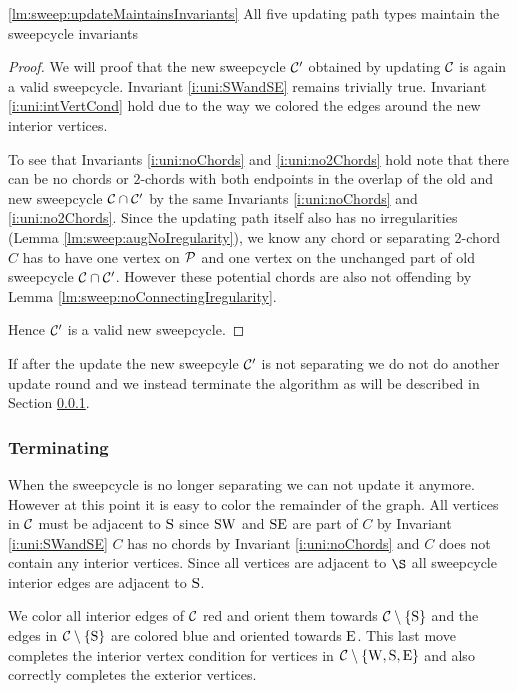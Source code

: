     \begin{lemma}
      \ref{lm:sweep:updateMaintainsInvariants}
      All five updating path types maintain the sweepcycle invariants
    \end{lemma}
    \begin{proof}
      We will proof that the new sweepcycle $\C'$ obtained by updating $\C$ is again a valid sweepcycle. Invariant \ref{i:uni:SWandSE} remains trivially true. Invariant \ref{i:uni:intVertCond} hold due to the way we colored the edges around the new interior vertices.

      To see that Invariants \ref{i:uni:noChords} and \ref{i:uni:no2Chords} hold note that there can be no chords or $2$-chords with both endpoints in the overlap of the old and new sweepcycle $\C \cap \C'$ by the same Invariants \ref{i:uni:noChords} and \ref{i:uni:no2Chords}. Since the updating path itself also has no irregularities (Lemma \ref{lm:sweep:augNoIregularity}),
      we know any chord or separating $2$-chord $C$ has to have one vertex on $\P$ and one vertex on the unchanged part of old sweepcycle $\C \cap \C'$. However these potential chords are also not offending by Lemma \ref{lm:sweep:noConnectingIregularity}.

      Hence $\C'$ is a valid new sweepcycle.
    \end{proof}

    If after the update the new sweepcyle $\C'$ is not separating we do not do another update round and we instead terminate the algorithm as will be described in Section \ref{sss:terminating}.

  \subsubsection{Terminating}
    \label{sss:terminating}
    When the sweepcycle is no longer separating we can not update it anymore. However at this point it is easy to color the remainder of the graph. All vertices in $\C$ must be adjacent to $\pS$ since $\pS \pW$ and $\pS \pE$ are part of $C$ by Invariant \ref{i:uni:SWandSE} $C$ has no chords by Invariant \ref{i:uni:noChords} and $C$ does not contain any interior vertices. Since all vertices are adjacent to $\S$ all sweepcycle interior edges are adjacent to $\pS$.

    We color all interior edges of $\C$ red and orient them towards $\cpath$ and the edges in $\cpath$ are colored blue and oriented towards $\pE$. This last move completes the interior vertex condition for vertices in $\C \sm {\pW, \pS, \pE}$ and also correctly completes the exterior vertices.


